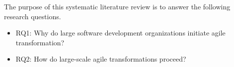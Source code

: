 The purpose of this systematic literature review is to answer the following
research questions.

\begin{itemize}
	\item{RQ1: Why do large software development organizations initiate agile
	transformation?}
	\item{RQ2: How do large-scale agile transformations proceed?}
\end{itemize}
